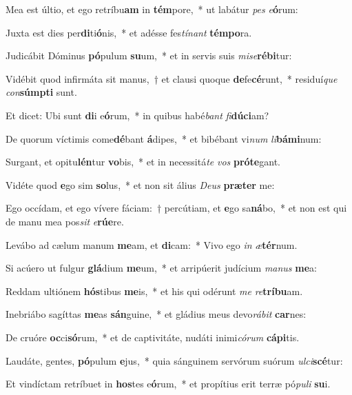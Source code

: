 \item Mea est últio, et ego retríbu\textbf{am} in \textbf{tém}pore,~* ut labátur \textit{pes} \textit{e}\textbf{ó}rum:
\item Juxta est dies per\textbf{di}ti\textbf{ó}nis,~* et adésse fes\textit{tí}\textit{nant} \textbf{tém}\textbf{po}ra.
\item Judicábit Dóminus \textbf{pó}pulum \textbf{su}um,~* et in servis suis \textit{mi}\textit{se}\textbf{ré}\textbf{bi}tur:
\item Vidébit quod infirmáta sit manus,~† et clausi quoque \textbf{de}fe\textbf{cé}runt,~* residuí\textit{que} \textit{con}\textbf{súmp}\textbf{ti} sunt.
\item Et dicet: Ubi sunt \textbf{di}i e\textbf{ó}rum,~* in quibus habé\textit{bant} \textit{fi}\textbf{dú}\textbf{ci}am?
\item De quorum víctimis come\textbf{dé}bant \textbf{á}dipes,~* et bibébant vi\textit{num} \textit{li}\textbf{bá}\textbf{mi}num:
\item Surgant, et opitu\textbf{lén}tur \textbf{vo}bis,~* et in necessitá\textit{te} \textit{vos} \textbf{pró}\textbf{te}gant.
\item Vidéte quod \textbf{e}go sim \textbf{so}lus,~* et non sit álius \textit{De}\textit{us} \textbf{præ}\textbf{ter} me:
\item Ego occídam, et ego vívere fáciam:~† percútiam, et \textbf{e}go sa\textbf{ná}bo,~* et non est qui de manu mea pos\textit{sit} \textit{e}\textbf{rú}\textbf{e}re.
\item Levábo ad cælum manum \textbf{me}am, et \textbf{di}cam:~* Vivo ego \textit{in} \textit{æ}\textbf{tér}num.
\item Si acúero ut fulgur \textbf{glá}dium \textbf{me}um,~* et arripúerit judícium \textit{ma}\textit{nus} \textbf{me}a:
\item Reddam ultiónem \textbf{hós}tibus \textbf{me}is,~* et his qui odérunt \textit{me} \textit{re}\textbf{trí}\textbf{bu}am.
\item Inebriábo sagíttas \textbf{me}as \textbf{sán}guine,~* et gládius meus devo\textit{rá}\textit{bit} \textbf{car}nes:
\item De cruóre \textbf{oc}ci\textbf{só}rum,~* et de captivitáte, nudáti inimi\textit{có}\textit{rum} \textbf{cá}\textbf{pi}tis.
\item Laudáte, gentes, \textbf{pó}pulum \textbf{e}jus,~* quia sánguinem servórum suórum \textit{ul}\textit{ci}\textbf{scé}tur:
\item Et vindíctam retríbuet in \textbf{hos}tes e\textbf{ó}rum,~* et propítius erit terræ pó\textit{pu}\textit{li} \textbf{su}i.

